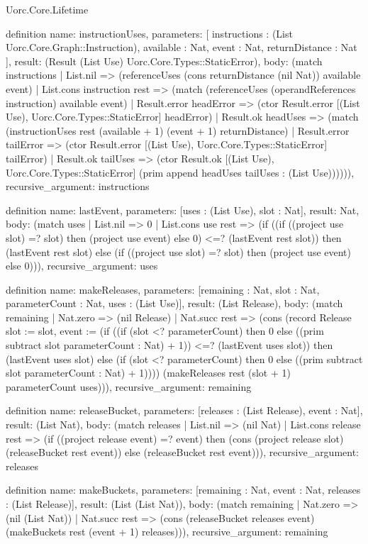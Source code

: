 \begin{lexlean}{Uorc.Core.Lifetime}
\begin{semanticmodule}
definition{
  name: instructionUses,
  parameters: [
    instructions : (List Uorc.Core.Graph::Instruction),
    available : Nat,
    event : Nat,
    returnDistance : Nat
  ],
  result: (Result (List Use) Uorc.Core.Types::StaticError),
  body: (match instructions
    | List.nil => (referenceUses (cons returnDistance (nil Nat)) available event)
    | List.cons instruction rest => (match (referenceUses (operandReferences instruction) available event)
      | Result.error headError => (ctor Result.error [(List Use), Uorc.Core.Types::StaticError] headError)
      | Result.ok headUses => (match (instructionUses rest (available + 1) (event + 1) returnDistance)
        | Result.error tailError => (ctor Result.error [(List Use), Uorc.Core.Types::StaticError] tailError)
        | Result.ok tailUses => (ctor Result.ok [(List Use), Uorc.Core.Types::StaticError] (prim append headUses tailUses : (List Use)))))),
  recursive_argument: instructions
}

definition{
  name: lastEvent,
  parameters: [uses : (List Use), slot : Nat],
  result: Nat,
  body: (match uses
    | List.nil => 0
    | List.cons use rest => (if ((if ((project use slot) =? slot) then (project use event) else 0) <=? (lastEvent rest slot)) then (lastEvent rest slot) else (if ((project use slot) =? slot) then (project use event) else 0))),
  recursive_argument: uses
}

definition{
  name: makeReleases,
  parameters: [remaining : Nat, slot : Nat, parameterCount : Nat, uses : (List Use)],
  result: (List Release),
  body: (match remaining
    | Nat.zero => (nil Release)
    | Nat.succ rest => (cons (record Release {slot := slot, event := (if ((if (slot <? parameterCount) then 0 else ((prim subtract slot parameterCount : Nat) + 1)) <=? (lastEvent uses slot)) then (lastEvent uses slot) else (if (slot <? parameterCount) then 0 else ((prim subtract slot parameterCount : Nat) + 1)))}) (makeReleases rest (slot + 1) parameterCount uses))),
  recursive_argument: remaining
}

definition{
  name: releaseBucket,
  parameters: [releases : (List Release), event : Nat],
  result: (List Nat),
  body: (match releases
    | List.nil => (nil Nat)
    | List.cons release rest => (if ((project release event) =? event) then (cons (project release slot) (releaseBucket rest event)) else (releaseBucket rest event))),
  recursive_argument: releases
}

definition{
  name: makeBuckets,
  parameters: [remaining : Nat, event : Nat, releases : (List Release)],
  result: (List (List Nat)),
  body: (match remaining
    | Nat.zero => (nil (List Nat))
    | Nat.succ rest => (cons (releaseBucket releases event) (makeBuckets rest (event + 1) releases))),
  recursive_argument: remaining
}


\end{semanticmodule}
\end{lexlean}

